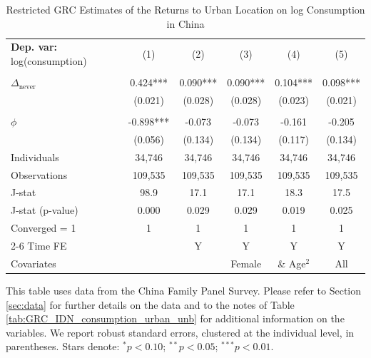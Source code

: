 \begin{table}[htbp] \centering \begin{threeparttable}
 \caption{Restricted GRC Estimates of the Returns to Urban Location on log Consumption in China} 
 \label{tab:GRC_CHN_consumption_urban_unb} 
\begin{tabular}{l ccccc} \toprule  \textbf{Dep. var:}  log(consumption) 
                    &\multicolumn{1}{c}{(1)}   &\multicolumn{1}{c}{(2)}   &\multicolumn{1}{c}{(3)}   &\multicolumn{1}{c}{(4)}   &\multicolumn{1}{c}{(5)}   \\
                    &               &               &               &               &               \\
$\Delta_{\text{never}}$&       0.424***&       0.090***&       0.090***&       0.104***&       0.098***\\
                    &     (0.021)   &     (0.028)   &     (0.028)   &     (0.023)   &     (0.021)   \\
                    &               &               &               &               &               \\
$\phi$               &      -0.898***&      -0.073   &      -0.073   &      -0.161   &      -0.205   \\
                    &     (0.056)   &     (0.134)   &     (0.134)   &     (0.117)   &     (0.134)   \\
\addlinespace
Individuals         &      34,746   &      34,746   &      34,746   &      34,746   &      34,746   \\
Observations        &     109,535   &     109,535   &     109,535   &     109,535   &     109,535   \\
J-stat              &        98.9   &        17.1   &        17.1   &        18.3   &        17.5   \\
J-stat (p-value)    &       0.000   &       0.029   &       0.029   &       0.019   &       0.025   \\
Converged = 1       &           1   &           1   &           1   &           1   &           1   \\
\cmidrule{2-6} Time FE & & Y & Y & Y & Y \\ Covariates & & & Female & \& Age$^2$ & All \\ \bottomrule \end{tabular} \begin{tablenotes} \footnotesize \item{This table uses data from the China Family Panel Survey. Please refer to Section \ref{sec:data} for further details on the data and to the notes of Table \ref{tab:GRC_IDN_consumption_urban_unb} for additional information on the variables. We report robust standard errors, clustered at the individual level, in parentheses. Stars denote: $^{*} p<0.10$; $^{**} p<0.05$; $^{***} p<0.01$.} \end{tablenotes} \end{threeparttable} \end{table}
